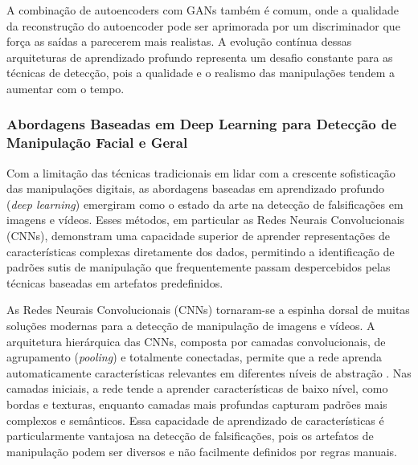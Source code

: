 A combinação de autoencoders com GANs também é comum, onde a qualidade da reconstrução do autoencoder pode ser aprimorada por um discriminador que força as saídas a parecerem mais realistas. A evolução contínua dessas arquiteturas de aprendizado profundo representa um desafio constante para as técnicas de detecção, pois a qualidade e o realismo das manipulações tendem a aumentar com o tempo.

\subsubsection{Abordagens Baseadas em Deep Learning para Detecção de Manipulação Facial e Geral}
Com a limitação das técnicas tradicionais em lidar com a crescente sofisticação das manipulações digitais, as abordagens baseadas em aprendizado profundo (\textit{deep learning}) emergiram como o estado da arte na detecção de falsificações em imagens e vídeos. Esses métodos, em particular as Redes Neurais Convolucionais (CNNs), demonstram uma capacidade superior de aprender representações de características complexas diretamente dos dados, permitindo a identificação de padrões sutis de manipulação que frequentemente passam despercebidos pelas técnicas baseadas em artefatos predefinidos.


As Redes Neurais Convolucionais (CNNs) tornaram-se a espinha dorsal de muitas soluções modernas para a detecção de manipulação de imagens e vídeos. A arquitetura hierárquica das CNNs, composta por camadas convolucionais, de agrupamento (\textit{pooling}) e totalmente conectadas, permite que a rede aprenda automaticamente características relevantes em diferentes níveis de abstração \cite{salles2021estimacao, langguth2021dont}. Nas camadas iniciais, a rede tende a aprender características de baixo nível, como bordas e texturas, enquanto camadas mais profundas capturam padrões mais complexos e semânticos. Essa capacidade de aprendizado de características é particularmente vantajosa na detecção de falsificações, pois os artefatos de manipulação podem ser diversos e não facilmente definidos por regras manuais.

